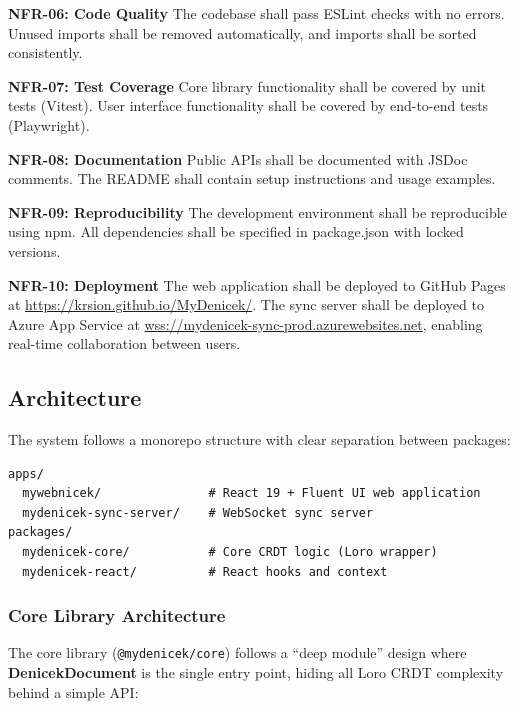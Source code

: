 \documentclass{article}
\begin{document}
\textbf{NFR-06: Code Quality} The codebase shall pass ESLint checks with no errors. Unused imports shall be removed automatically, and imports shall be sorted consistently.

\textbf{NFR-07: Test Coverage} Core library functionality shall be covered by unit tests (Vitest). User interface functionality shall be covered by end-to-end tests (Playwright).

\textbf{NFR-08: Documentation} Public APIs shall be documented with JSDoc comments. The README shall contain setup instructions and usage examples.

\textbf{NFR-09: Reproducibility} The development environment shall be reproducible using npm. All dependencies shall be specified in package.json with locked versions.

\textbf{NFR-10: Deployment} The web application shall be deployed to GitHub Pages at \url{https://krsion.github.io/MyDenicek/}. The sync server shall be deployed to Azure App Service at \url{wss://mydenicek-sync-prod.azurewebsites.net}, enabling real-time collaboration between users.


\subsection{Architecture}

The system follows a monorepo structure with clear separation between packages:

\begin{verbatim}
apps/
  mywebnicek/               # React 19 + Fluent UI web application
  mydenicek-sync-server/    # WebSocket sync server
packages/
  mydenicek-core/           # Core CRDT logic (Loro wrapper)
  mydenicek-react/          # React hooks and context
\end{verbatim}

\subsubsection{Core Library Architecture}

The core library (\texttt{@mydenicek/core}) follows a ``deep module'' design where \textbf{DenicekDocument} is the single entry point, hiding all Loro CRDT complexity behind a simple API:
\end{document}
